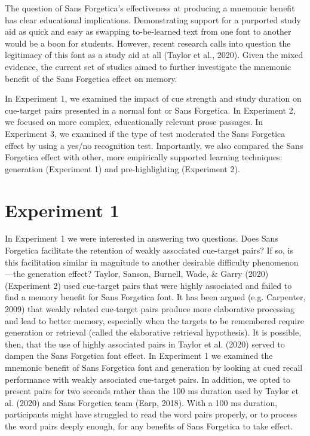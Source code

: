\documentclass[jou]{apa6}
\begin{document}
The question of Sans Forgetica's effectiveness at producing a mnemonic benefit has clear educational implications. Demonstrating support for a purported study aid as quick and easy as swapping to-be-learned text from one font to another would be a boon for students. However, recent research calls into question the legitimacy of this font as a study aid at all (Taylor et al., 2020). Given the mixed evidence, the current set of studies aimed to further investigate the mnemonic benefit of the Sans Forgetica effect on memory.

In Experiment 1, we examined the impact of cue strength and study duration on cue-target pairs presented in a normal font or Sans Forgetica. In Experiment 2, we focused on more complex, educationally relevant prose passages. In Experiment 3, we examined if the type of test moderated the Sans Forgetica effect by using a yes/no recognition test. Importantly, we also compared the Sans Forgetica effect with other, more empirically supported learning techniques: generation (Experiment 1) and pre-highlighting (Experiment 2).

\hypertarget{experiment-1}{%
\section{Experiment 1}\label{experiment-1}}

In Experiment 1 we were interested in answering two questions. Does Sans Forgetica facilitate the retention of weakly associated cue-target pairs? If so, is this facilitation similar in magnitude to another desirable difficulty phenomenon---the generation effect? Taylor, Sanson, Burnell, Wade, \& Garry (2020)(Experiment 2) used cue-target pairs that were highly associated and failed to find a memory benefit for Sans Forgetica font. It has been argued (e.g. Carpenter, 2009) that weakly related cue-target pairs produce more elaborative processing and lead to better memory, especially when the targets to be remembered require generation or retrieval (called the elaborative retrieval hypothesis). It is possible, then, that the use of highly associated pairs in Taylor et al. (2020) served to dampen the Sans Forgetica font effect. In Experiment 1 we examined the mnemonic benefit of Sans Forgetica font and generation by looking at cued recall performance with weakly associated cue-target pairs. In addition, we opted to present pairs for two seconds rather than the 100 ms duration used by Taylor et al. (2020) and Sans Forgetica team (Earp, 2018). With a 100 ms duration, participants might have struggled to read the word pairs properly, or to process the word pairs deeply enough, for any benefits of Sans Forgetica to take effect.
\end{document}
